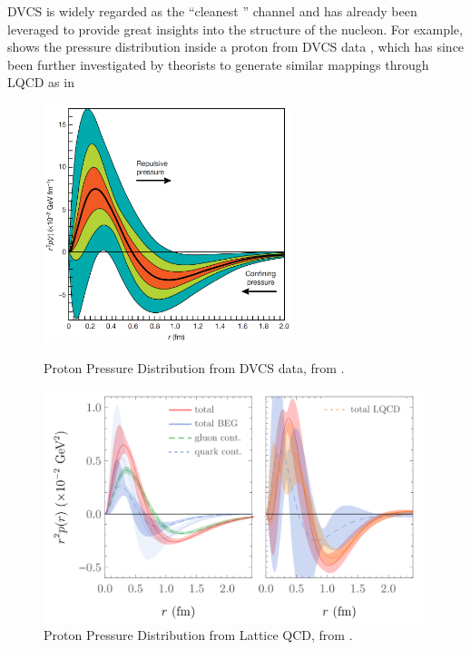         DVCS is widely regarded as the ``cleanest '' channel and has already been leveraged to provide great insights into the structure of the nucleon. For example,  shows the pressure distribution inside a proton from DVCS data \parencite{Burkert2018TheProton}, which has since been further investigated by theorists to generate similar mappings through LQCD as in 

        \begin{figure}[H]
        \centering
        \begin{minipage}{0.48\textwidth}
            \centering
            \includegraphics[width=0.65\textwidth]{Chapters/Ch1-Intro/Ch1-Sec2-GPDs-DVMP/pics/proton_pressure_dist.png}
            \caption{Proton Pressure Distribution from DVCS data, from \parencite{Burkert2018TheProton}.}
            \label{fig:proton_pressure_exp}
        \end{minipage}\hfill
        \begin{minipage}{0.48\textwidth}
            \centering
            \includegraphics[width=0.99\textwidth]{Chapters/Ch1-Intro/Ch1-Sec2-GPDs-DVMP/pics/proton_pressure_theory.png}
            \caption{Proton Pressure Distribution from Lattice QCD, from \parencite{Shanahan2019PressureProton}.}
            \label{fig:proton_pressure_theory}
        \end{minipage}
    \end{figure}


